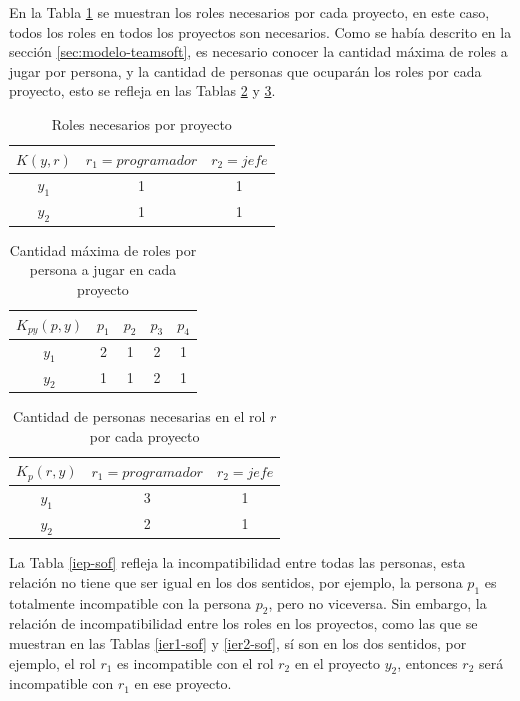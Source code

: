 En la Tabla \ref{crp-sof} se muestran los roles necesarios por cada proyecto, en este caso, todos los roles en todos los proyectos son necesarios. Como se había descrito en la sección \ref{sec:modelo-teamsoft}, es necesario conocer la cantidad máxima de roles a jugar por persona, y la cantidad de personas que ocuparán los roles por cada proyecto, esto se refleja en las Tablas \ref{cmrpp-sof} y \ref{cpnr-sof}.

\begin{table}[H]
  \centering
  \caption{Roles necesarios por proyecto}\label{crp-sof}
\begin{tabular}{|c|c|c|}
  \hline
  $K(y,r)$ & $r_1=programador$ & $r_2=jefe$  \\ \hline
  $y_1$ & 1 & 1   \\ \hline
  $y_2$ & 1 & 1   \\ \hline
\end{tabular}
\end{table}


\begin{table}[H]
	\centering
	\caption{Cantidad máxima de roles por persona a jugar en cada proyecto }\label{cmrpp-sof}
	\begin{tabular}{|c|c|c|c|c|}
		\hline
		$K_{py}(p,y)$ & $p_1$ & $p_2$ & $p_3$  & $p_4$  \\ \hline
		$y_1$ 		  &   2	  &    1  &	   2   &    1  \\ \hline
		$y_2$ 		  &   1   &    1  &    2   &    1  \\
		\hline
	\end{tabular}
\end{table}


\begin{table}[H]
	\centering
	\caption{Cantidad de personas necesarias en el rol $r$ por cada proyecto}\label{cpnr-sof}
	\begin{tabular}{|c|c|c|}
		\hline
		 $K_{p}(r, y)$ & $r_1=programador$ & $r_2=jefe$  \\ \hline
			$y_1$	   & 		3	 	&		1 		 \\ \hline
			$y_2$	   & 		2	 	&		1   	 \\ \hline
	\end{tabular}
\end{table}


La Tabla \ref{iep-sof} refleja la incompatibilidad entre todas las personas, esta relación no tiene que ser igual en los dos sentidos, por ejemplo, la persona $p_1$ es totalmente incompatible con la persona $p_2$, pero no viceversa. Sin embargo, la relación de incompatibilidad entre los roles en los proyectos, como las que se muestran en las Tablas \ref{ier1-sof} y \ref{ier2-sof}, sí son en los dos sentidos, por ejemplo, el rol $r_1$ es incompatible con el rol $r_2$ en el proyecto $y_2$, entonces $r_2$ será incompatible con $r_1$ en ese proyecto.

